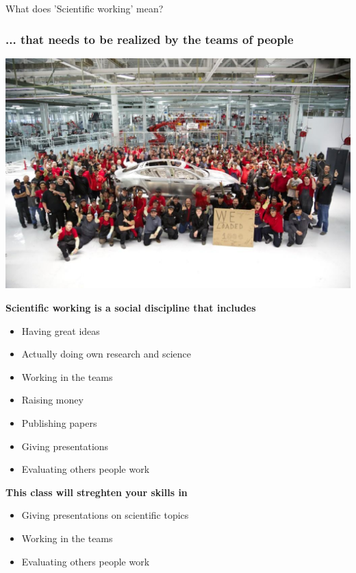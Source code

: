 \begin{frame}{What does 'Scientific working' mean?}
\frametitle{... that needs to be realized by the teams of people}
 \includegraphics[width=\linewidth]{img/teslateam.eps}
\end{frame}

\begin{frame}
\textbf{Scientific working is a social discipline that includes}
\begin{itemize}
\item Having great ideas
\item Actually doing own research and science
\item Working in the teams
\item Raising money
\item Publishing papers
\item Giving presentations
\item Evaluating others people work
\end{itemize}
\textbf{This class will streghten your skills in}
\begin{itemize}
\item Giving presentations on scientific topics
\item Working in the teams
\item Evaluating others people work
\end{itemize}
\end{frame}

